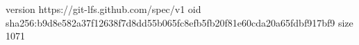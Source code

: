 version https://git-lfs.github.com/spec/v1
oid sha256:b9d8e582a37f12638f7d8dd55b065fc8efb5fb20f81e60cda20a65fdbf917bf9
size 1071

